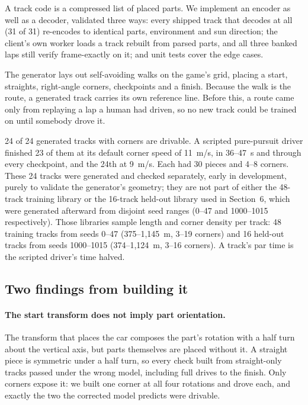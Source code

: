 \documentclass[11pt]{article}
\begin{document}
A track code is a compressed list of placed parts. We implement an encoder as well as a decoder, validated three ways: every shipped track that decodes at all (31 of 31) re-encodes to identical parts, environment and sun direction; the client's own worker loads a track rebuilt from parsed parts, and all three banked laps still verify frame-exactly on it; and unit tests cover the edge cases.

The generator lays out self-avoiding walks on the game's grid, placing a start, straights, right-angle corners, checkpoints and a finish. Because the walk is the route, a generated track carries its own reference line. Before this, a route came only from replaying a lap a human had driven, so no new track could be trained on until somebody drove it.

24 of 24 generated tracks with corners are drivable. A scripted pure-pursuit driver finished 23 of them at its default corner speed of 11~m/s, in 36--47~s and through every checkpoint, and the 24th at 9~m/s. Each had 30 pieces and 4--8 corners. These 24 tracks were generated and checked separately, early in development, purely to validate the generator's geometry; they are not part of either the 48-track training library or the 16-track held-out library used in Section~6, which were generated afterward from disjoint seed ranges (0--47 and 1000--1015 respectively). Those libraries sample length and corner density per track: 48 training tracks from seeds 0--47 (375--1,145~m, 3--19 corners) and 16 held-out tracks from seeds 1000--1015 (374--1,124~m, 3--16 corners). A track's par time is the scripted driver's time halved.

\subsection{Two findings from building it}

\paragraph{The start transform does not imply part orientation.} The transform that places the car composes the part's rotation with a half turn about the vertical axis, but parts themselves are placed without it. A straight piece is symmetric under a half turn, so every check built from straight-only tracks passed under the wrong model, including full drives to the finish. Only corners expose it: we built one corner at all four rotations and drove each, and exactly the two the corrected model predicts were drivable.
\end{document}
